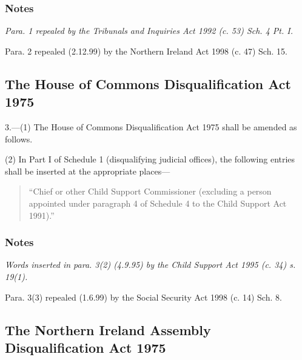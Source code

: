 \documentclass[a4paper]{article}
\newcommand\amendment[1]{\subsubsection*{Notes}{\itshape\frenchspacing\footnotesize #1 \par}}
\begin{document}
%

\amendment{
Para. 1 repealed by the Tribunals and Inquiries Act 1992 (c. 53) Sch. 4 Pt. I.

\medskip

Para. 2 repealed (2.12.99) by the Northern Ireland Act 1998 (c. 47) Sch. 15.}

\subsection*{The House of Commons Disqualification Act 1975}

3.---(1) The House of Commons Disqualification Act 1975 shall be amended as follows.

(2) In Part I of Schedule 1 (disqualifying judicial offices), the following entries shall be inserted at the appropriate places— 
\begin{quotation}
“Chief or other Child Support Commissioner (excluding a person appointed under paragraph 4 of Schedule 4 to the Child Support Act 1991).''
\end{quotation}


\amendment{
Words inserted in para. 3(2) (4.9.95) by the Child Support Act 1995 (c. 34) s. 19(1).

Para. 3(3) repealed (1.6.99) by the Social Security Act 1998 (c. 14) Sch. 8.
}

\subsection*{The Northern Ireland Assembly Disqualification Act 1975}
\end{document}
